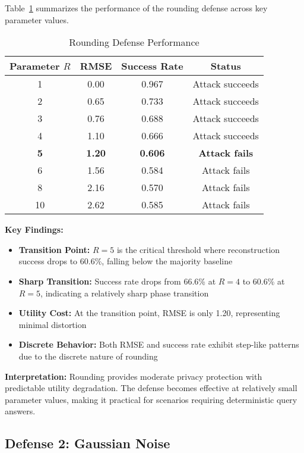 \documentclass[11pt,letterpaper]{article}
\begin{document}
Table~\ref{tab:rounding} summarizes the performance of the rounding defense across key parameter values.

\begin{table}[H]
\centering
\caption{Rounding Defense Performance}
\label{tab:rounding}
\begin{tabular}{@{}cccc@{}}
\toprule
\textbf{Parameter $R$} & \textbf{RMSE} & \textbf{Success Rate} & \textbf{Status} \\ \midrule
1 & 0.00 & 0.967 & Attack succeeds \\
2 & 0.65 & 0.733 & Attack succeeds \\
3 & 0.76 & 0.688 & Attack succeeds \\
4 & 1.10 & 0.666 & Attack succeeds \\
\textbf{5} & \textbf{1.20} & \textbf{0.606} & \textbf{Attack fails} \\
6 & 1.56 & 0.584 & Attack fails \\
8 & 2.16 & 0.570 & Attack fails \\
10 & 2.62 & 0.585 & Attack fails \\ \bottomrule
\end{tabular}
\end{table}

\textbf{Key Findings:}

\begin{itemize}[leftmargin=*]
    \item \textbf{Transition Point:} $R = 5$ is the critical threshold where reconstruction success drops to 60.6\%, falling below the majority baseline
    \item \textbf{Sharp Transition:} Success rate drops from 66.6\% at $R=4$ to 60.6\% at $R=5$, indicating a relatively sharp phase transition
    \item \textbf{Utility Cost:} At the transition point, RMSE is only 1.20, representing minimal distortion
    \item \textbf{Discrete Behavior:} Both RMSE and success rate exhibit step-like patterns due to the discrete nature of rounding
\end{itemize}

\textbf{Interpretation:} Rounding provides moderate privacy protection with predictable utility degradation. The defense becomes effective at relatively small parameter values, making it practical for scenarios requiring deterministic query answers.

\subsection{Defense 2: Gaussian Noise}
\end{document}
